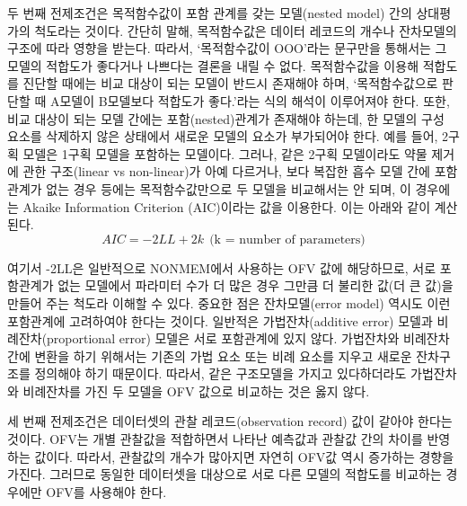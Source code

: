 \documentclass[
  11pt,
  krantz2,
  a4paper]{krantz}
\theoremstyle{definition}
\theoremstyle{definition}
\theoremstyle{definition}
\theoremstyle{remark}
\begin{document}
두 번째 전제조건은 목적함수값이 포함 관계를 갖는 모델(nested model) 간의 상대평가의 척도라는 것이다. 간단히 말해, 목적함수값은 데이터 레코드의 개수나 잔차모델의 구조에 따라 영향을 받는다. 따라서, `목적함수값이 OOO'라는 문구만을 통해서는 그 모델의 적합도가 좋다거나 나쁘다는 결론을 내릴 수 없다. 목적함수값을 이용해 적합도를 진단할 때에는 비교 대상이 되는 모델이 반드시 존재해야 하며, `목적함수값으로 판단할 때 A모델이 B모델보다 적합도가 좋다.'라는 식의 해석이 이루어져야 한다. 또한, 비교 대상이 되는 모델 간에는 포함(nested)관계가 존재해야 하는데, 한 모델의 구성 요소를 삭제하지 않은 상태에서 새로운 모델의 요소가 부가되어야 한다. 예를 들어, 2구획 모델은 1구획 모델을 포함하는 모델이다. 그러나, 같은 2구획 모델이라도 약물 제거에 관한 구조(linear vs non-linear)가 아예 다르거나, 보다 복잡한 흡수 모델 간에 포함 관계가 없는 경우 등에는 목적함수값만으로 두 모델을 비교해서는 안 되며, 이 경우에는 Akaike Information Criterion (AIC)이라는 값을 이용한다. 이는 아래와 같이 계산된다.
\begin{equation}
AIC = -2LL + 2k \ \ \text{(k = number of parameters)}
\label{eq:aic}
\end{equation}


여기서 -2LL은 일반적으로 NONMEM에서 사용하는 OFV 값에 해당하므로, 서로 포함관계가 없는 모델에서 파라미터 수가 더 많은 경우 그만큼 더 불리한 값(더 큰 값)을 만들어 주는 척도라 이해할 수 있다. 중요한 점은 잔차모델(error model) 역시도 이런 포함관계에 고려하여야 한다는 것이다. 일반적은 가법잔차(additive error) 모델과 비례잔차(proportional error) 모델은 서로 포함관계에 있지 않다. 가법잔차와 비례잔차 간에 변환을 하기 위해서는 기존의 가법 요소 또는 비례 요소를 지우고 새로운 잔차구조를 정의해야 하기 때문이다. 따라서, 같은 구조모델을 가지고 있다하더라도 가법잔차와 비례잔차를 가진 두 모델을 OFV 값으로 비교하는 것은 옳지 않다.

세 번째 전제조건은 데이터셋의 관찰 레코드(observation record) 값이 같아야 한다는 것이다. OFV는 개별 관찰값을 적합하면서 나타난 예측값과 관찰값 간의 차이를 반영하는 값이다. 따라서, 관찰값의 개수가 많아지면 자연히 OFV값 역시 증가하는 경향을 가진다. 그러므로 동일한 데이터셋을 대상으로 서로 다른 모델의 적합도를 비교하는 경우에만 OFV를 사용해야 한다.
\end{document}
